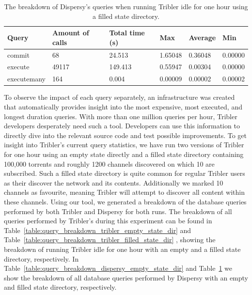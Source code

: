 \begin{table}[h]
	\centering
	\caption{The breakdown of Dispersy's queries when running Tribler idle for one hour using a filled state directory.}
	\label{table:query_breakdown_dispersy_filled_state_dir}
	\begin{tabular}{|l|l|l|l|l|l|}
		\hline
		\textbf{Query} & \textbf{Amount of calls} & \textbf{Total time (s)} & \textbf{Max} & \textbf{Average} & \textbf{Min} \\ \hline
		commit   & 68   & 24.513   & 1.65048   & 0.36048   & 0.00000   \\ \hline
		execute   & 49117   & 149.413   & 0.55947   & 0.00304   & 0.00000   \\ \hline
		executemany   & 164   & 0.004   & 0.00009   & 0.00002   & 0.00002   \\ \hline
	\end{tabular}
\end{table}

To observe the impact of each query separately, an infrastructure was created that automatically provides insight into the most expensive, most executed, and longest duration queries. 
With more than one million queries per hour, Tribler developers desperately need such a tool.
Developers can use this information to directly dive into the relevant source code and test possible improvements.
To get insight into Tribler's current query statistics, we have run two versions of Tribler for one hour using an empty state directly and a filled state directory containing 100,000 torrents and roughly 1200 channels discovered on which 10 are subscribed.
Such a filled state directory is quite common for regular Tribler users as their discover the network and its contents.
Additionally we marked 10 channels as favourite, meaning Tribler will attempt to discover all content within these channels.
Using our tool, we generated a breakdown of the database queries performed by both Tribler and Dispersy for both runs.
The breakdown of all queries performed by Tribler's during this experiment can be found in Table~\ref{table:query_breakdown_tribler_empty_state_dir} and Table~\ref{table:query_breakdown_tribler_filled_state_dir} , showing the breakdown of running Tribler idle for one hour with an empty and a filled state directory, respectively.
In Table~\ref{table:query_breakdown_dispersy_empty_state_dir} and Table~\ref{table:query_breakdown_dispersy_filled_state_dir} we show the breakdown of all database queries performed by Dispersy with an empty and filled state directory, respectively.

